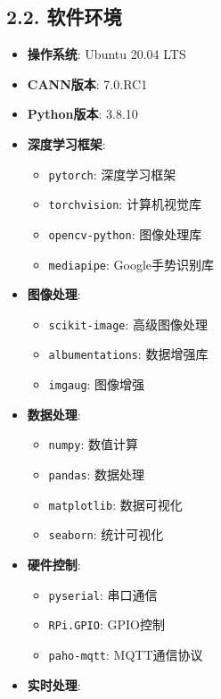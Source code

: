 \subsection{2.2. 软件环境}\label{ux8f6fux4ef6ux73afux5883}

\begin{itemize}
\tightlist
\item
  \textbf{操作系统}: Ubuntu 20.04 LTS
\item
  \textbf{CANN版本}: 7.0.RC1
\item
  \textbf{Python版本}: 3.8.10
\item
  \textbf{深度学习框架}:

  \begin{itemize}
  \tightlist
  \item
    \passthrough{\lstinline!pytorch!}: 深度学习框架
  \item
    \passthrough{\lstinline!torchvision!}: 计算机视觉库
  \item
    \passthrough{\lstinline!opencv-python!}: 图像处理库
  \item
    \passthrough{\lstinline!mediapipe!}: Google手势识别库
  \end{itemize}
\item
  \textbf{图像处理}:

  \begin{itemize}
  \tightlist
  \item
    \passthrough{\lstinline!scikit-image!}: 高级图像处理
  \item
    \passthrough{\lstinline!albumentations!}: 数据增强库
  \item
    \passthrough{\lstinline!imgaug!}: 图像增强
  \end{itemize}
\item
  \textbf{数据处理}:

  \begin{itemize}
  \tightlist
  \item
    \passthrough{\lstinline!numpy!}: 数值计算
  \item
    \passthrough{\lstinline!pandas!}: 数据处理
  \item
    \passthrough{\lstinline!matplotlib!}: 数据可视化
  \item
    \passthrough{\lstinline!seaborn!}: 统计可视化
  \end{itemize}
\item
  \textbf{硬件控制}:

  \begin{itemize}
  \tightlist
  \item
    \passthrough{\lstinline!pyserial!}: 串口通信
  \item
    \passthrough{\lstinline!RPi.GPIO!}: GPIO控制
  \item
    \passthrough{\lstinline!paho-mqtt!}: MQTT通信协议
  \end{itemize}
\item
  \textbf{实时处理}:


\end{itemize}

